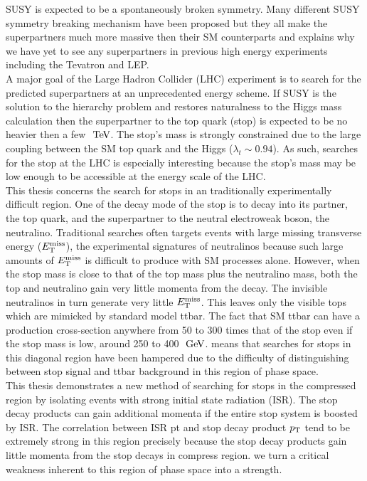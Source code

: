 \indent SUSY is expected to be a spontaneously broken symmetry.  Many different SUSY symmetry breaking mechanism have been proposed but they all make the superpartners much more massive then their SM counterparts and explains why we have yet to see any superpartners in previous high energy experiments including the Tevatron and LEP.  \\

\indent A major goal of the Large Hadron Collider (LHC) experiment is to search for the predicted superpartners at an unprecedented energy scheme.  If SUSY is the solution to the hierarchy problem and restores naturalness to the Higgs mass calculation then the superpartner to the top quark (stop) is expected to be no heavier then a few $\tev$.  The stop's mass is strongly constrained due to the large coupling between the SM top quark and the Higgs ($\lambda_t \sim 0.94$).  As such, searches for the stop at the LHC is especially interesting because the stop's mass may be low enough to be accessible at the energy scale of the LHC. \\

\indent This thesis concerns the search for stops in an traditionally experimentally difficult region.  One of the decay mode of the stop is to decay into its partner, the top quark, and the superpartner to the neutral electroweak boson, the neutralino. Traditional searches often targets events with large missing transverse energy ($E_{\mathrm{T}}^{\mathrm{miss}}$), the experimental signatures of neutralinos because such large amounts of $E_{\mathrm{T}}^{\mathrm{miss}}$ is difficult to produce with SM processes alone.  However, when the stop mass is close to that of the top mass plus the neutralino mass, both the top and neutralino gain very little momenta from the decay. The invisible neutralinos in turn generate very little $E_{\mathrm{T}}^{\mathrm{miss}}$. This leaves only the visible tops which are mimicked by standard model ttbar.  The fact that SM ttbar can have a production cross-section anywhere from 50 to 300 times that of the stop even if the stop mass is low, around 250 to 400 $\gev$. means that searches for stops in this diagonal region have been hampered due to the difficulty of distinguishing between stop signal and ttbar background in this region of phase space. \\

\indent This thesis demonstrates a new method of searching for stops in the compressed region by isolating events with strong initial state radiation (ISR).  The stop decay products can gain additional momenta if the entire stop system is boosted by ISR.  The correlation between ISR pt and stop decay product $p_{\mathrm{T}}$ tend to be extremely strong in this region precisely because the stop decay products gain little momenta from the stop decays in compress region.  we turn a critical weakness inherent to this region of phase space into a strength.  \\

